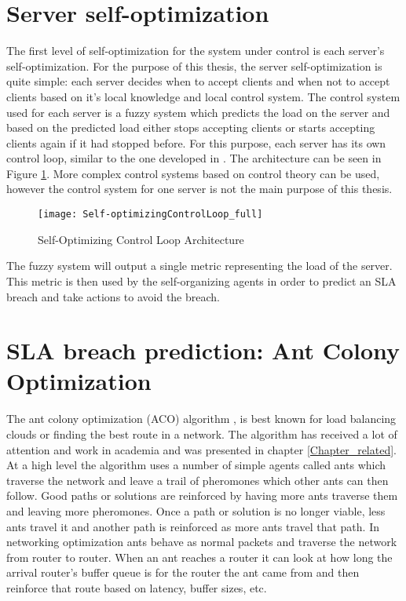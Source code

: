 \section{Server self-optimization}

The first level of self-optimization for the system under control is each server's self-optimization. For the purpose of this thesis, the server self-optimization is quite simple: each server decides when to accept clients and when not to accept clients based on it's local knowledge and local control system. The control system used for each server is a fuzzy system which predicts the load on the server and based on the predicted load either stops accepting clients or starts accepting clients again if it had stopped before. For this purpose, each server has its own control loop, similar to the one developed in \cite{bogdan:seams07}. The architecture can be seen in Figure \ref{fig:selfopt-archi}. More complex control systems based on control theory can be used, however the control system for one server is not the main purpose of this thesis.

\begin{figure}
	\centering
	\texttt{[image: Self-optimizingControlLoop\_full]}
	\caption{Self-Optimizing Control Loop Architecture}
	\label{fig:selfopt-archi}
\end{figure}

The fuzzy system will output a single metric representing the load of the server. This metric is then used by the self-organizing agents in order to predict an SLA breach and take actions to avoid the breach.

\section{SLA breach prediction: Ant Colony Optimization}

The ant colony optimization (ACO) algorithm \cite{antalgorithm}, \cite{selforg:aco} is best known for load balancing clouds or finding the best route in a network. The algorithm has received a lot of attention and work in academia and was presented in chapter \ref{Chapter_related}. At a high level the algorithm uses a number of simple agents called ants which traverse the network and leave a trail of pheromones which other ants can then follow. Good paths or solutions are reinforced by having more ants traverse them and leaving more pheromones. Once a path or solution is no longer viable, less ants travel it and another path is reinforced as more ants travel that path. In networking optimization ants behave as normal packets and traverse the network from router to router. When an ant reaches a router it can look at how long the arrival router's buffer queue is for the router the ant came from and then reinforce that route based on latency, buffer sizes, etc.

